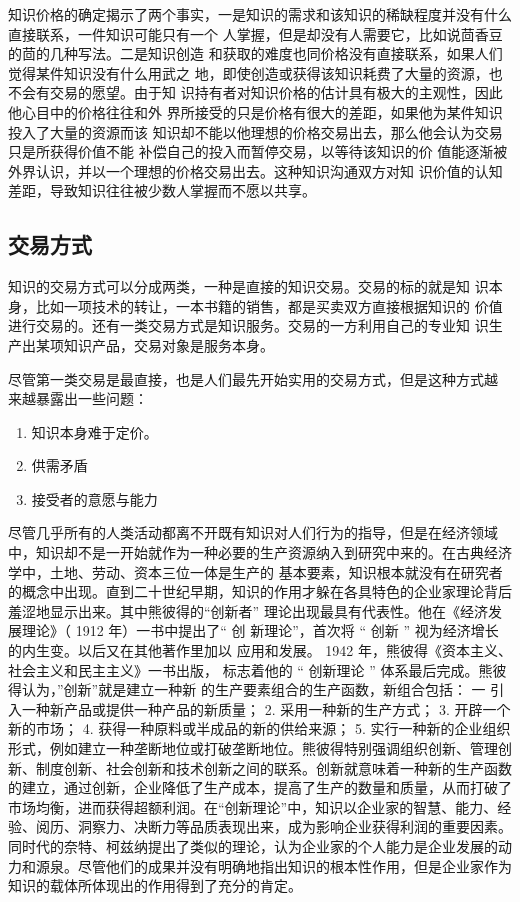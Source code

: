 \documentclass[12pt,a4paper]{ctexart}
\begin{document}
知识价格的确定揭示了两个事实，一是知识的需求和该知识的稀缺程度并没有什么直接联系，一件知识可能只有一个
  人掌握，但是却没有人需要它，比如说茴香豆的茴的几种写法。二是知识创造
  和获取的难度也同价格没有直接联系，如果人们觉得某件知识没有什么用武之
  地，即使创造或获得该知识耗费了大量的资源，也不会有交易的愿望。由于知
  识持有者对知识价格的估计具有极大的主观性，因此他心目中的价格往往和外
  界所接受的只是价格有很大的差距，如果他为某件知识投入了大量的资源而该
  知识却不能以他理想的价格交易出去，那么他会认为交易只是所获得价值不能
  补偿自己的投入而暂停交易，以等待该知识的价
  值能逐渐被外界认识，并以一个理想的价格交易出去。这种知识沟通双方对知
  识价值的认知差距，导致知识往往被少数人掌握而不愿以共享。

\subsection{交易方式}
知识的交易方式可以分成两类，一种是直接的知识交易。交易的标的就是知
识本身，比如一项技术的转让，一本书籍的销售，都是买卖双方直接根据知识的
价值进行交易的。还有一类交易方式是知识服务。交易的一方利用自己的专业知
识生产出某项知识产品，交易对象是服务本身。

尽管第一类交易是最直接，也是人们最先开始实用的交易方式，但是这种方式越
来越暴露出一些问题：
\begin{enumerate}
\item 知识本身难于定价。
\item 供需矛盾
\item 接受者的意愿与能力
\end{enumerate}



尽管几乎所有的人类活动都离不开既有知识对人们行为的指导，但是在经济领域中，知识却不是一开始就作为一种必要的生产资源纳入到研究中来的。在古典经济学中，土地、劳动、资本三位一体是生产的
基本要素，知识根本就没有在研究者的概念中出现。直到二十世纪早期，知识的作用才躲在各具特色的企业家理论背后羞涩地显示出来。其中熊彼得的“创新者”
理论出现最具有代表性。他在《经济发展理论》（ 1912 年）一书中提出了“ 创
新理论”，首次将 “ 创新 ” 视为经济增长的内生变。以后又在其他著作里加以
应用和发展。 1942 年，熊彼得《资本主义、社会主义和民主主义》一书出版，
标志着他的 “ 创新理论 ” 体系最后完成。熊彼得认为，”创新”就是建立一种新
的生产要素组合的生产函数，新组合包括： 一 引入一种新产品或提供一种产品的新质量； 2. 采用一种新的生产方式； 3. 开辟一个新的市场； 4. 获得一种原料或半成品的新的供给来源； 5. 实行一种新的企业组织形式，例如建立一种垄断地位或打破垄断地位。熊彼得特别强调组织创新、管理创新、制度创新、社会创新和技术创新之间的联系。创新就意味着一种新的生产函数的建立，通过创新，企业降低了生产成本，提高了生产的数量和质量，从而打破了市场均衡，进而获得超额利润。在“创新理论”中，知识以企业家的智慧、能力、经验、阅历、洞察力、决断力等品质表现出来，成为影响企业获得利润的重要因素。同时代的奈特、柯兹纳提出了类似的理论，认为企业家的个人能力是企业发展的动力和源泉。尽管他们的成果并没有明确地指出知识的根本性作用，但是企业家作为知识的载体所体现出的作用得到了充分的肯定。
\end{document}
